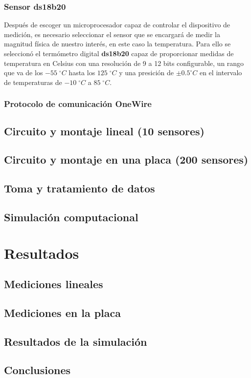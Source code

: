 \documentclass[12pt]{article}
\begin{document}
\subsubsection{Sensor ds18b20}

Después de escoger un microprocesador capaz de controlar el dispositivo de medición, es necesario seleccionar el sensor que se encargará de medir la magnitud física de nuestro interés, en este caso la temperatura. Para ello se seleccionó el termómetro digital \textbf{ds18b20} capaz de proporcionar medidas de temperatura en Celsius con una resolución de 9 a 12 bits configurable, un rango que va de los $-55 \; ^{\circ}C$ hasta los $125 \; ^{\circ}C$ y una presición de $\pm 0.5 ^{\circ}C$ en el intervalo de temperaturas de $-10 \; ^{\circ}C$ a $85 \; ^{\circ}C$. \\



\subsubsection{Protocolo de comunicación OneWire}


\subsection{Circuito y montaje lineal (10 sensores)}
\subsection{Circuito y montaje en una placa (200 sensores)}
\subsection{Toma y tratamiento de datos}
\subsection{Simulación computacional}

\section{Resultados}
\subsection{Mediciones lineales}
\subsection{Mediciones en la placa}
\subsection{Resultados de la simulación}
\subsection{Conclusiones}
\end{document}
